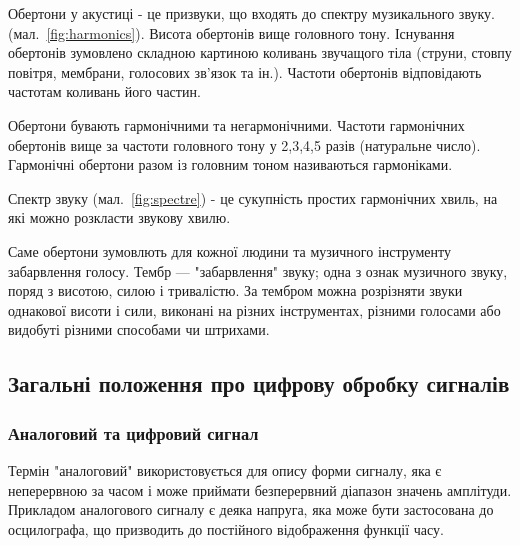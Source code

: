 


Обертони у акустиці - це призвуки, що входять до спектру музикального звуку. (мал.~\ref{fig:harmonics}). Висота обертонів вище головного тону. Існування обертонів зумовлено складною картиною коливань звучащого тіла (струни, стовпу повітря, мембрани, голосових зв'язок та ін.). Частоти обертонів відповідають частотам коливань його частин.

Обертони бувають гармонічними та негармонічними. Частоти гармонічних обертонів вище за частоти головного тону у 2,3,4,5 разів (натуральне число). Гармонічні обертони разом із головним тоном називаються гармоніками.

Спектр звуку (мал.~\ref{fig:spectre}) - це сукупність простих гармонічних хвиль, на які можно розкласти звукову хвилю. \cite{келдыш1973музыкальная}

Саме обертони зумовлють для кожної людини та музичного інструменту забарвлення голосу. Тембр — "забарвлення" звуку; одна з ознак музичного звуку, поряд з висотою, силою і тривалістю. За тембром можна розрізняти звуки однакової висоти і сили, виконані на різних інструментах, різними голосами або видобуті різними способами чи штрихами. \cite{юцевич2003музика}

\subsection{Загальні положення про цифрову обробку сигналів}

\subsubsection{Аналоговий та цифровий сигнал}



Термін "аналоговий" використовується для опису форми сигналу, яка є неперервною за часом і може приймати безперервний діапазон значень амплітуди. Прикладом аналогового сигналу є деяка напруга, яка може бути застосована до осцилографа, що призводить до постійного відображення функції часу.

